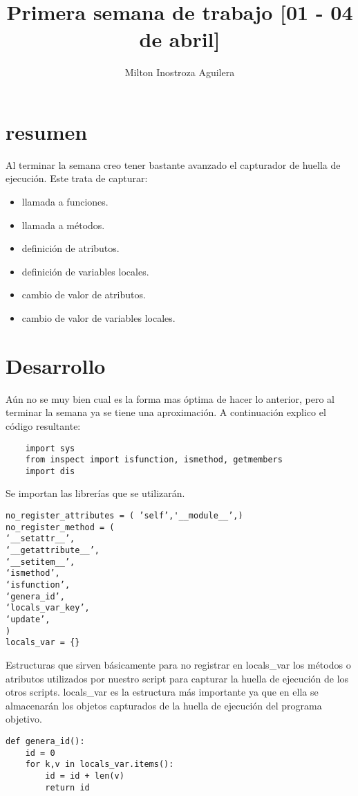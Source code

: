 \documentclass[10pt,a4paper]{article}
\author{Milton Inostroza Aguilera}
\title{Primera semana de trabajo [01 - 04 de abril]}
\begin{document}
\maketitle
\section*{resumen}
Al terminar la semana creo tener bastante avanzado el capturador de huella de ejecución.  Este trata de capturar:
\begin{itemize}
\item llamada a funciones.
\item llamada a métodos.
\item definición de atributos.
\item definición de variables locales.
\item cambio de valor de atributos.
\item cambio de valor de variables locales.
\end{itemize}
\pagebreak
\tableofcontents
\pagebreak
\section{Desarrollo}

Aún no se muy bien cual es la forma mas óptima de hacer lo anterior, pero al terminar la semana ya se tiene una aproximación.  A continuación explico el código resultante:

\begin{verbatim}
	import sys
	from inspect import isfunction, ismethod, getmembers
	import dis
\end{verbatim}

Se importan las librerías que se utilizarán.

\begin{verbatim}
no_register_attributes = ( ’self’,'__module__’,)
no_register_method = (
‘__setattr__’,
‘__getattribute__’,
‘__setitem__’,
‘ismethod’,
‘isfunction’,
‘genera_id’,
‘locals_var_key’,
‘update’,
)
locals_var = {}
\end{verbatim}

Estructuras que sirven básicamente para no registrar en locals\_var los métodos o atributos utilizados por nuestro script para capturar la huella de ejecución de los otros scripts. locals\_var es la estructura más importante ya que en ella se almacenarán los objetos capturados de la huella de ejecución del programa objetivo.

\begin{verbatim}
def genera_id():
    id = 0
    for k,v in locals_var.items():
        id = id + len(v)
        return id
\end{verbatim}
\end{document}
